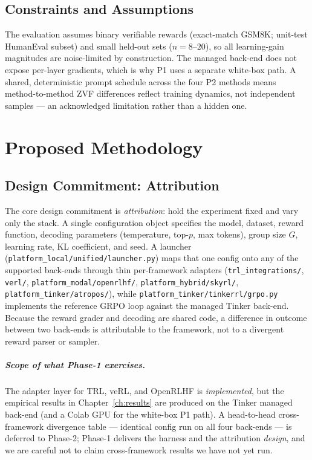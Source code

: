 \documentclass[12pt,a4paper]{report}
\begin{document}
\section{Constraints and Assumptions}
The evaluation assumes binary verifiable rewards (exact-match GSM8K; unit-test
HumanEval subset) and small held-out sets ($n=8$--$20$), so all learning-gain
magnitudes are noise-limited by construction. The managed back-end does not expose
per-layer gradients, which is why P1 uses a separate white-box path. A shared,
deterministic prompt schedule across the four P2 methods means method-to-method ZVF
differences reflect training dynamics, not independent samples --- an acknowledged
limitation rather than a hidden one.

\chapter{Proposed Methodology}
\label{ch:method}

\section{Design Commitment: Attribution}
\label{sec:harness}

The core design commitment is \emph{attribution}: hold the experiment fixed and vary
only the stack. A single configuration object specifies the model, dataset, reward
function, decoding parameters (temperature, top-$p$, max tokens), group size $G$,
learning rate, KL coefficient, and seed. A launcher (\texttt{platform_local/unified/launcher.py})
maps that one config onto any of the supported back-ends through thin per-framework
adapters (\texttt{trl\_integrations/}, \texttt{verl/}, \texttt{platform_modal/openrlhf/},
\texttt{platform_hybrid/skyrl/}, \texttt{platform_tinker/atropos/}), while \texttt{platform_tinker/tinkerrl/grpo.py} implements the
reference GRPO loop against the managed Tinker back-end. Because the reward grader
and decoding are shared code, a difference in outcome between two back-ends is
attributable to the framework, not to a divergent reward parser or sampler.

\paragraph{Scope of what Phase-1 exercises.} The adapter layer for TRL, veRL, and
OpenRLHF is \emph{implemented}, but the empirical results in Chapter~\ref{ch:results}
are produced on the Tinker managed back-end (and a Colab GPU for the white-box P1
path). A head-to-head cross-framework divergence table --- identical config run on all
four back-ends --- is deferred to Phase-2; Phase-1 delivers the harness and the
attribution \emph{design}, and we are careful not to claim cross-framework results we
have not yet run.
\end{document}
